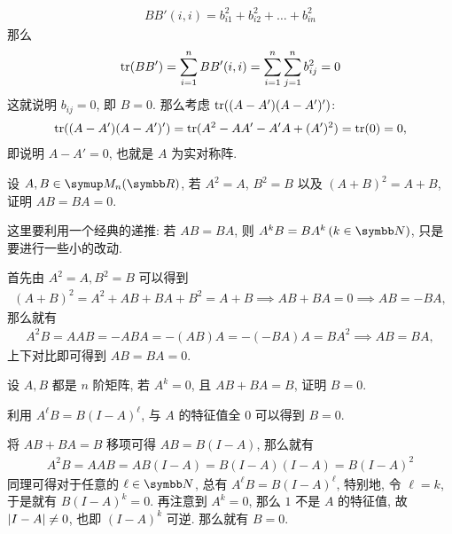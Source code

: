 \begin{exercise}[series=exer]
\begin{answer}
        \begin{align*}
            BB'(i, i) = b_{i1}^{2} + b_{i2}^{2} + \dots + b_{in}^{2}
        \end{align*}
        那么
        \begin{align*}
            \tr(BB') = \sum_{i = 1}^{n} BB'(i, i) = \sum_{i = 1}^{n}\sum_{j = 1}^{n} b_{ij}^{2} = 0
        \end{align*}
        这就说明 $ b_{ij} = 0 $, 即 $ B = 0 $. 那么考虑 $ \tr((A - A')(A - A')') $:
        \begin{align*}
            \tr((A - A')(A - A')') = \tr(A^{2} - AA' - A'A + (A')^{2}) = \tr(0) = 0,
        \end{align*}
        即说明 $ A - A' = 0 $, 也就是 $ A $ 为实对称阵.
    \end{answer}
    \item 设 $ A, B \in \MM $, 若 $ A^{2} = A $, $ B^{2} = B $ 以及 $ (A + B)^{2} = A + B $, 证明 $ AB = BA = 0 $.  
    \begin{hint}
        这里要利用一个经典的递推: 若 $ AB = BA $, 则 $ A^{k}B = BA^{k}\,(k \in \N) $, 只是要进行一些小的改动.
    \end{hint}
    \begin{answer}
        首先由 $ A^{2} = A, B^{2} = B $ 可以得到
        \begin{align*}
            (A + B)^{2} = A^{2} + AB + BA + B^{2} = A + B \implies AB + BA = 0 \implies AB = -BA,
        \end{align*}
        那么就有
        \begin{align*}
            A^{2}B = AAB = -ABA = -(AB)A = -(-BA)A = BA^{2} \implies AB = BA,
        \end{align*}
        上下对比即可得到 $ AB = BA = 0 $.
    \end{answer}
    \item 设 $ A, B $ 都是 $ n $ 阶矩阵, 若 $ A^{k} = 0 $, 且 $ AB + BA = B $, 证明 $ B = 0 $. 
    \begin{hint}
        利用 $ A^{\ell}B = B(I - A)^{\ell} $, 与 $ A $ 的特征值全 $ 0 $ 可以得到 $ B = 0 $.
    \end{hint}
    \begin{answer}
        将 $ AB + BA = B $ 移项可得 $ AB = B(I - A) $, 那么就有
        \begin{align*}
            A^{2}B = AAB = AB(I - A) = B(I - A)(I - A) = B(I - A)^{2}
        \end{align*}
        同理可得对于任意的 $ \ell \in \N $, 总有 $ A^{\ell}B = B(I - A)^{\ell} $, 特别地, 令 $ \ell = k $, 于是就有 $ B(I - A)^{k} = 0 $. 再注意到 $ A^{k} = 0 $, 那么 $ 1 $ 不是 $ A $ 的特征值, 故 $ \abs{I - A} \ne 0 $, 也即 $ (I - A)^{k} $ 可逆. 那么就有 $ B = 0 $.

\end{answer}
\end{exercise}
